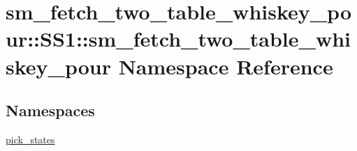 \hypertarget{namespacesm__fetch__two__table__whiskey__pour_1_1SS1_1_1sm__fetch__two__table__whiskey__pour}{}\section{sm\+\_\+fetch\+\_\+two\+\_\+table\+\_\+whiskey\+\_\+pour\+:\+:S\+S1\+:\+:sm\+\_\+fetch\+\_\+two\+\_\+table\+\_\+whiskey\+\_\+pour Namespace Reference}
\label{namespacesm__fetch__two__table__whiskey__pour_1_1SS1_1_1sm__fetch__two__table__whiskey__pour}
\subsection*{Namespaces}
\begin{DoxyCompactItemize}
\item 
 \hyperlink{namespacesm__fetch__two__table__whiskey__pour_1_1SS1_1_1sm__fetch__two__table__whiskey__pour_1_1pick__states}{pick\+\_\+states}
\end{DoxyCompactItemize}
